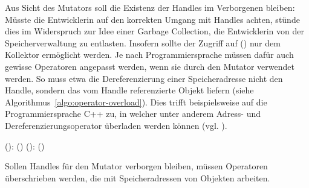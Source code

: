 Aus Sicht des Mutators soll die Existenz der Handles im Verborgenen bleiben:
Müsste die Entwicklerin auf den korrekten Umgang mit Handles achten, stünde dies im Widerspruch zur Idee einer Garbage Collection, die Entwicklerin von der Speicherverwaltung zu entlasten.
Insofern sollte der Zugriff auf () nur dem Kollektor ermöglicht werden.
Je nach Programmiersprache müssen dafür auch gewisse Operatoren angepasst werden, wenn sie durch den Mutator verwendet werden.
So muss etwa die Dereferenzierung einer Speicheradresse nicht den Handle, sondern das vom Handle referenzierte Objekt liefern (siehe Algorithmus~\ref{algo:operator-overload}).
Dies trifft beispielsweise auf die Programmiersprache C++ zu, in welcher unter anderem Adress- und Dereferenzierungsoperator überladen werden können (vgl. \cite[Kap. 18]{cpp}).

\begin{algorithm}
\begin{algorithmic}[1]
	\State {}():
	\State \quad \Return {}()		
	\Statex
	\State {}():
	\State \quad \Return {}()		
\end{algorithmic}
\caption[Operatoranpassung zur Verbergung von Handles]{Sollen Handles für den Mutator verborgen bleiben, müssen Operatoren überschrieben werden, die mit Speicheradressen von Objekten arbeiten.}
\label{algo:operator-overload}
\end{algorithm}

